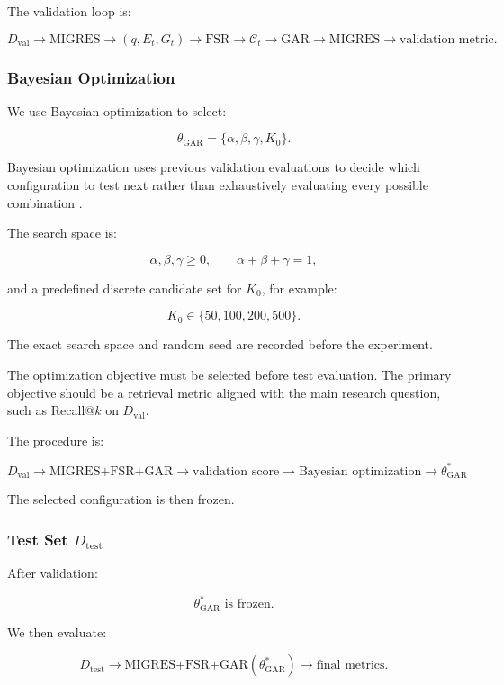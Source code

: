 \documentclass[11pt,a4paper]{article}
\begin{document}
The validation loop is:

\[
D_{\mathrm{val}}
\rightarrow
\text{MIGRES}
\rightarrow
(q,E_t,G_t)
\rightarrow
\text{FSR}
\rightarrow
\mathcal{C}_t
\rightarrow
\text{GAR}
\rightarrow
\text{MIGRES}
\rightarrow
\text{validation metric}.
\]

\subsubsection{Bayesian Optimization}

We use Bayesian optimization to select:

\[
\theta_{\mathrm{GAR}}
=
\{\alpha,\beta,\gamma,K_0\}.
\]

Bayesian optimization uses previous validation evaluations to decide which configuration to test next rather than exhaustively evaluating every possible combination \citep{snoek2012practical}.

The search space is:

\[
\alpha,\beta,\gamma\geq0,
\qquad
\alpha+\beta+\gamma=1,
\]

and a predefined discrete candidate set for $K_0$, for example:

\[
K_0\in\{50,100,200,500\}.
\]

The exact search space and random seed are recorded before the experiment.

The optimization objective must be selected before test evaluation. The primary objective should be a retrieval metric aligned with the main research question, such as Recall@$k$ on $D_{\mathrm{val}}$.

The procedure is:

\[
\boxed{
D_{\mathrm{val}}
\rightarrow
\text{MIGRES+FSR+GAR}
\rightarrow
\text{validation score}
\rightarrow
\text{Bayesian optimization}
\rightarrow
\theta^*_{\mathrm{GAR}}
}
\]

The selected configuration is then frozen.

\subsubsection{Test Set $D_{\mathrm{test}}$}

After validation:

\[
\boxed{
\theta^*_{\mathrm{GAR}}
\text{ is frozen.}
}
\]

We then evaluate:

\[
D_{\mathrm{test}}
\rightarrow
\text{MIGRES+FSR+GAR}(\theta^*_{\mathrm{GAR}})
\rightarrow
\text{final metrics}.
\]
\end{document}
